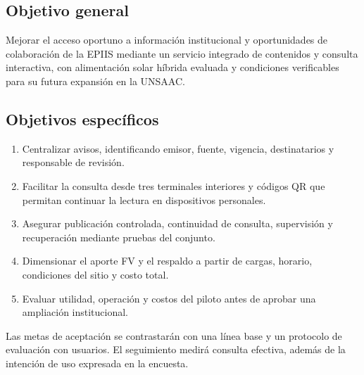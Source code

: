 \subsection{Objetivo general}
Mejorar el acceso oportuno a información institucional y oportunidades de colaboración de la EPIIS mediante un servicio integrado de contenidos y consulta interactiva, con alimentación solar híbrida evaluada y condiciones verificables para su futura expansión en la UNSAAC.

\subsection{Objetivos específicos}
\begin{enumerate}
\item Centralizar avisos, identificando emisor, fuente, vigencia, destinatarios y responsable de revisión.
\item Facilitar la consulta desde tres terminales interiores y códigos QR que permitan continuar la lectura en dispositivos personales.
\item Asegurar publicación controlada, continuidad de consulta, supervisión y recuperación mediante pruebas del conjunto.
\item Dimensionar el aporte FV y el respaldo a partir de cargas, horario, condiciones del sitio y costo total.
\item Evaluar utilidad, operación y costos del piloto antes de aprobar una ampliación institucional.
\end{enumerate}

Las metas de aceptación se contrastarán con una línea base y un protocolo de evaluación con usuarios. El seguimiento medirá consulta efectiva, además de la intención de uso expresada en la encuesta.

